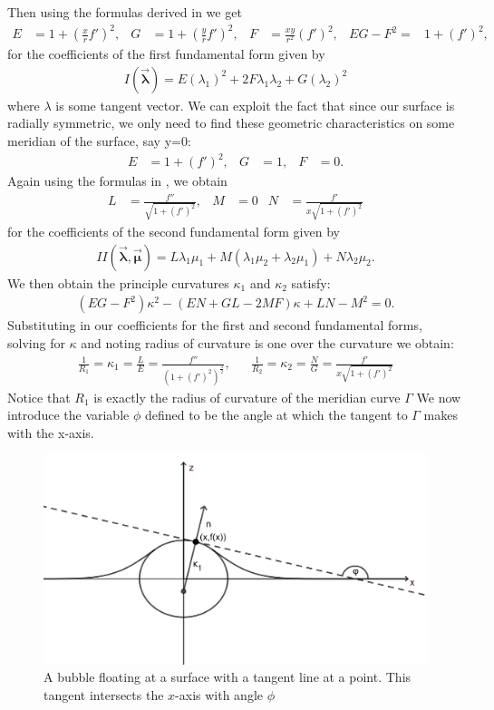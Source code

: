 Then using the formulas derived in \cite{toponogov2006differential} we get
\begin{align}
    E&=1+(\frac{x}{r}f')^2,&G&=1+(\frac{y}{r}f')^2, &F&=\frac{xy}{r^2}(f')^2, &EG-F^2=&1+(f')^2,
\end{align}
for the coefficients of the first fundamental form given by
\begin{align}
    I( \vec{ \boldsymbol\lambda}) = E(\lambda_1)^2 +2F\lambda_1 \lambda_2 + G(\lambda_2)^2
\end{align}
where $\lambda$ is some tangent vector. We can exploit the fact that since our surface is radially symmetric, we only need to find these geometric characteristics on some meridian of the surface, say y=0:
\begin{align}
    E&=1+(f')^2,& G&=1, &F&=0.
\end{align}
Again using the formulas in \cite{toponogov2006differential}, we obtain
\begin{align}
    L&=\frac{f''}{\sqrt{1+(f')^2}},&M&=0&  N&=\frac{f'}{x\sqrt{1+(f')^2}}
\end{align}
for the coefficients of the second fundamental form given by
\begin{align}
    II( \vec{ \boldsymbol\lambda},\vec{ \boldsymbol\mu}) = L\lambda_1 \mu_1 +M(\lambda_1\mu_2 + \lambda_2 \mu_1)  + N\lambda_2 \mu_2.
\end{align}
We then obtain the principle curvatures $\kappa_1$ and $\kappa_2$ satisfy:
\begin{align}
    (EG-F^2)\kappa^2 - (EN+GL -2MF)\kappa +LN-M^2 = 0.
\end{align}
Substituting in our coefficients for the first and second fundamental forms, solving for $\kappa$ and noting radius of curvature is one over the curvature we obtain:
\begin{align}
    \frac{1}{R_1} =\kappa_1= \frac{L}{E}=\frac{f''}{(1+(f')^2)^{\frac{3}{2}}}, && \frac{1}{R_2} = \kappa_2 = \frac{N}{G} = \frac{f'}{x \sqrt{1+(f')^2}}
\end{align}
Notice that $R_1$ is exactly the radius of curvature of the meridian curve $\Gamma$
We now introduce the variable $\phi$ defined to be the angle at which the tangent to $\Gamma$ makes with the x-axis. 
\begin{figure}
    \centering
    \includegraphics[width=0.55\linewidth]{WriteUp/images/tangent to bubble extra.png}
    \caption{A bubble floating at a surface with a tangent line at a point. This tangent intersects the $x$-axis with angle $\phi$}
    \label{fig:3}
\end{figure}
